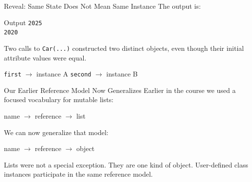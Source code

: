 \documentclass[aspectratio=169,10pt]{beamer}
\begin{document}
\begin{frame}{Reveal: Same State Does Not Mean Same Instance}
  The output is:

  \begin{block}{Output}
    \texttt{2025}\\
    \texttt{2020}
  \end{block}

  Two calls to \texttt{Car(...)} constructed two distinct objects, even though their initial attribute values were equal.

  \begin{center}
    \texttt{first} $\rightarrow$ instance A \qquad\qquad
    \texttt{second} $\rightarrow$ instance B
  \end{center}
\end{frame}


\begin{frame}{Our Earlier Reference Model Now Generalizes}
  Earlier in the course we used a focused vocabulary for mutable lists:

  \begin{center}
    name $\longrightarrow$ reference $\longrightarrow$ list
  \end{center}

  We can now generalize that model:

  \begin{center}
    \Large name $\longrightarrow$ reference $\longrightarrow$ object
  \end{center}

  \begin{keyidea}
    Lists were not a special exception. They are one kind of object. User-defined class instances participate in the same reference model.
  \end{keyidea}
\end{frame}
\end{document}
